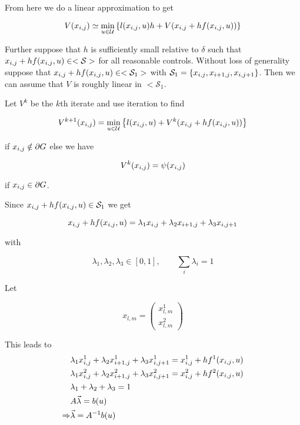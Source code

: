 From here we do a linear approximation to get

\begin{equation*}
V(x_{i,j}) \simeq \min_{u\in\mathcal{U}}\left\lbrace l(x_{i,j},u)h + V(x_{i,j} + hf(x_{i,j},u)) \right\rbrace
\end{equation*}

Further suppose that $h$ is sufficiently small relative to $\delta$ such that $x_{i,j}+hf(x_{i,j},u)\in<\mathcal{S}>$ for all reasonable controls.
Without loss of generality suppose that $x_{i,j}+hf(x_{i,j},u)\in<\mathcal{S}_1>$ with $\mathcal{S}_1=\{x_{i,j},x_{i+1,j},x_{i,j+1}\}$.
Then we can assume that $V$ is roughly linear in $<\mathcal{S}_1$.

Let $V^k$ be the $k$th iterate and use iteration to find

\begin{equation*}
V^{k+1}(x_{i,j}) = \min_{u\in\mathcal{U}}\left\lbrace l(x_{i,j},u) + V^k(x_{i,j}+hf(x_{i,j},u))\right\rbrace
\end{equation*}

if $x_{i,j}\notin\partial G$ else we have

\begin{equation*}
V^k(x_{i,j})=\psi(x_{i,j})
\end{equation*}

if $x_{i,j}\in\partial G$.

Since $x_{i,j}+hf(x_{i,j},u)\in\mathcal{S}_1$ we get

\begin{equation*}
x_{i,j}+hf(x_{i,j},u) = \lambda_1x_{i,j} + \lambda_2x_{i+1,j} + \lambda_3x_{i,j+1}
\end{equation*}

with

\begin{equation*}
\lambda_1,\lambda_2,\lambda_3\in[0,1], \qquad \sum_i\lambda_i=1
\end{equation*}

Let

\begin{equation*}
x_{l,m} = \left(\begin{array}{c} x_{l,m}^1 \\ x_{l,m}^2 \end{array}\right)
\end{equation*}

This leads to
\begin{align*}
&\lambda_1x_{i,j}^1 + \lambda_2x_{i+1,j}^1 + \lambda_3x_{i,j+1}^1 = x_{i,j}^1+hf^1(x_{i,j},u) \\
&\lambda_1x_{i,j}^2 + \lambda_2x_{i+1,j}^2 + \lambda_3x_{i,j+1}^2 = x_{i,j}^2+hf^2(x_{i,j},u) \\
&\lambda_1 + \lambda_2 + \lambda_3 = 1 \\
&A\vec{\lambda} = b(u) \\
\Rightarrow &\vec{\lambda} = A^{-1}b(u)
\end{align*}

